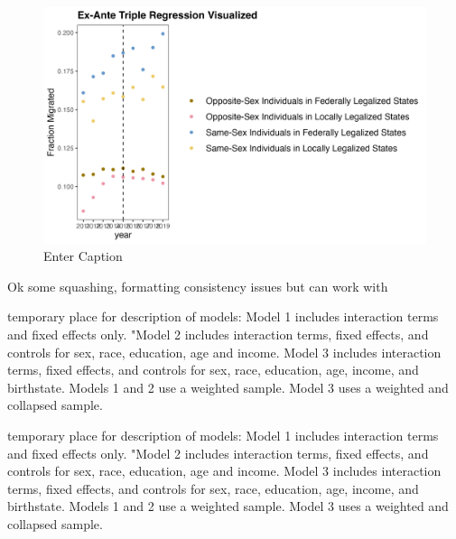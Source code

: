 \documentclass[]{article}
\begin{document}
\begin{figure}
    \centering
    \includegraphics[width=1\linewidth]{outputs/summary_stats/ante_trends.png}
    \caption{Enter Caption}
    \label{fig:enter-label}
\end{figure}

Ok some squashing, formatting consistency issues but can work with


\clearpage



temporary place for description of models:
Model 1 includes interaction terms and fixed effects only. "Model 2 includes interaction terms, fixed effects, and controls for sex, race, education, age and income. Model 3 includes interaction terms, fixed effects, and controls for sex, race, education, age, income, and birthstate. Models 1 and 2 use a weighted sample. Model 3 uses a weighted and collapsed sample.

\clearpage


temporary place for description of models:
Model 1 includes interaction terms and fixed effects only. "Model 2 includes interaction terms, fixed effects, and controls for sex, race, education, age and income. Model 3 includes interaction terms, fixed effects, and controls for sex, race, education, age, income, and birthstate. Models 1 and 2 use a weighted sample. Model 3 uses a weighted and collapsed sample.
\end{document}

